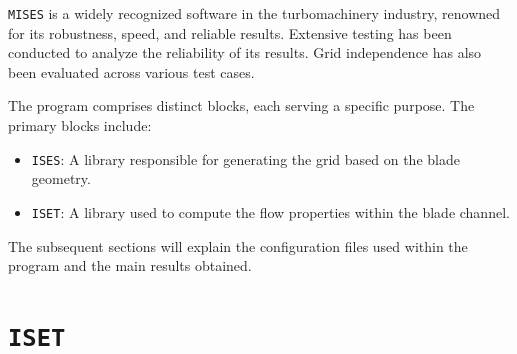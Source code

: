 \texttt{MISES} is a widely recognized software in the turbomachinery industry, renowned for its robustness, speed, and reliable results. Extensive testing has been conducted to analyze the reliability of its results. Grid independence has also been evaluated across various test cases.

The program comprises distinct blocks, each serving a specific purpose. The primary blocks include:

\begin{itemize}
    \item \texttt{ISES}: A library responsible for generating the grid based on the blade geometry.
    \item \texttt{ISET}: A library used to compute the flow properties within the blade channel.
\end{itemize}

The subsequent sections will explain the configuration files used within the program and the main results obtained.

\section{\texttt{ISET}}


% 


